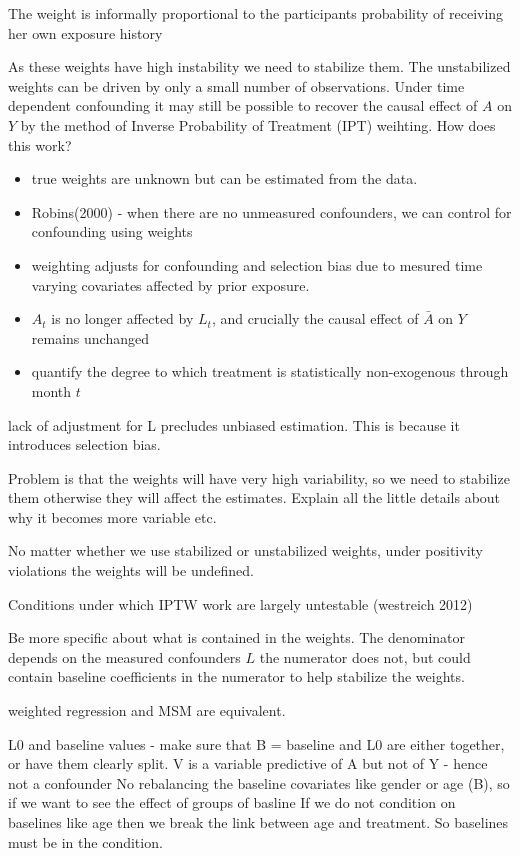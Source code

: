 \documentclass[11pt]{article}
\providecommand{\tightlist}{%
      \setlength{\itemsep}{0pt}\setlength{\parskip}{0pt}}
\begin{document}
The weight is informally proportional to the participants probability of
receiving her own exposure history

As these weights have high instability we need to stabilize them. The
unstabilized weights can be driven by only a small number of
observations. Under time dependent confounding it may still be possible
to recover the causal effect of \(A\) on \(Y\) by the method of Inverse
Probability of Treatment (IPT) weihting. How does this work?

\begin{itemize}
\tightlist
\item
  true weights are unknown but can be estimated from the data.
\item
  Robins(2000) - when there are no unmeasured confounders, we can
  control for confounding using weights
\item
  weighting adjusts for confounding and selection bias due to mesured
  time varying covariates affected by prior exposure.
\item
  \(A_t\) is no longer affected by \(L_t\), and crucially the causal
  effect of \(\bar A\) on \(Y\) remains unchanged
\item
  quantify the degree to which treatment is statistically non-exogenous
  through month \(t\)
\end{itemize}

lack of adjustment for L precludes unbiased estimation. This is because
it introduces selection bias.

Problem is that the weights will have very high variability, so we need
to stabilize them otherwise they will affect the estimates. Explain all
the little details about why it becomes more variable etc.

No matter whether we use stabilized or unstabilized weights, under
positivity violations the weights will be undefined.

Conditions under which IPTW work are largely untestable (westreich 2012)

Be more specific about what is contained in the weights. The denominator
depends on the measured confounders \(L\) the numerator does not, but
could contain baseline coefficients in the numerator to help stabilize
the weights.

weighted regression and MSM are equivalent.

L0 and baseline values - make sure that B = baseline and L0 are either
together, or have them clearly split. V is a variable predictive of A
but not of Y - hence not a confounder No rebalancing the baseline
covariates like gender or age (B), so if we want to see the effect of
groups of basline If we do not condition on baselines like age then we
break the link between age and treatment. So baselines must be in the
condition.
\end{document}
